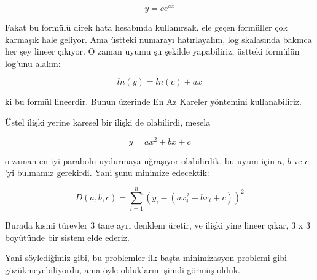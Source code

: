 \documentclass[12pt,fleqn]{article}\usepackage{../../common}
\begin{document}
$$ y = ce^{ax} $$

Fakat bu formülü direk hata hesabında kullanırsak, ele geçen formüller çok
karmaşık hale geliyor. Ama üstteki numarayı hatırlayalım, log skalasında bakınca
her şey lineer çıkıyor. O zaman uyumu şu şekilde yapabiliriz, üstteki formülün
log'unu alalım:

$$ ln(y) = ln(c) + ax $$

ki bu formül lineerdir. Bunun üzerinde En Az Kareler yöntemini
kullanabiliriz. 

Üstel ilişki yerine karesel bir ilişki de olabilirdi, mesela

$$ y = ax^2 + bx + c $$

o zaman en iyi parabolu uydurmaya uğraşıyor olabilirdik, bu uyum için $a$,
$b$ ve $c$'yi bulmamız gerekirdi. Yani şunu minimize edecektik:

$$ D(a,b,c) = \sum_{i=1}^n (y_i - ( ax_i^2 + bx_i + c ))^2  $$

Burada kısmi türevler 3 tane ayrı denklem üretir, ve ilişki yine lineer
çıkar, 3 x 3 boyütünde bir sistem elde ederiz. 

Yani söylediğimiz gibi, bu problemler ilk başta minimizasyon problemi gibi
gözükmeyebiliyordu, ama öyle olduklarını şimdi görmüş olduk. 
\end{document}
